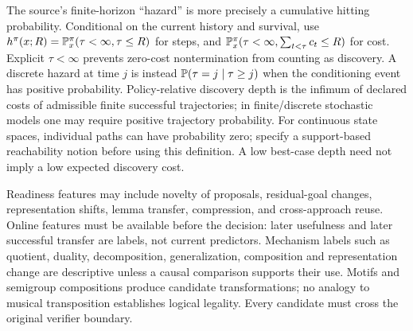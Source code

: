 \documentclass[11pt]{article}
\theoremstyle{definition}\newtheorem{definition}[theorem]{Definition}\newtheorem{example}[theorem]{Example}\newtheorem{conjecture}[theorem]{Conjecture}
\begin{document}
The source's finite-horizon ``hazard'' is more precisely a cumulative hitting probability. Conditional on the current history and survival, use $h^\pi(x;R)=\mathbb P^\pi_x(\tau<\infty,\tau\le R)$ for steps, and $\mathbb P^\pi_x(\tau<\infty,\sum_{t<\tau}c_t\le R)$ for cost. Explicit $\tau<\infty$ prevents zero-cost nontermination from counting as discovery. A discrete hazard at time $j$ is instead $\mathbb P(\tau=j\mid\tau\ge j)$ when the conditioning event has positive probability. Policy-relative discovery depth is the infimum of declared costs of admissible finite successful trajectories; in finite/discrete stochastic models one may require positive trajectory probability. For continuous state spaces, individual paths can have probability zero; specify a support-based reachability notion before using this definition. A low best-case depth need not imply a low expected discovery cost.

Readiness features may include novelty of proposals, residual-goal changes, representation shifts, lemma transfer, compression, and cross-approach reuse. Online features must be available before the decision: later usefulness and later successful transfer are labels, not current predictors. Mechanism labels such as quotient, duality, decomposition, generalization, composition and representation change are descriptive unless a causal comparison supports their use. Motifs and semigroup compositions produce candidate transformations; no analogy to musical transposition establishes logical legality. Every candidate must cross the original verifier boundary.
\end{document}

